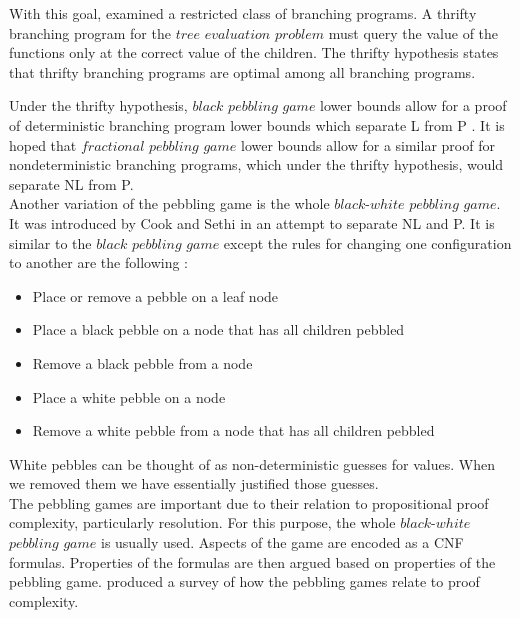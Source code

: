 \documentclass[12pt]{article}
\begin{document}
With this goal, \cite{c:pebjournal} examined a restricted class of branching programs. A thrifty branching program for the $tree$ $evaluation$ $problem$ must query the value of the functions only at the correct value of the children. The thrifty hypothesis states that thrifty branching programs are optimal among all branching programs.

Under the thrifty hypothesis, $black$ $pebbling$ $game$ lower bounds allow for a proof of deterministic branching program lower bounds which separate L from P \cite{c:pebjournal}. It is hoped that $fractional $ $pebbling$ $game$ lower bounds allow for a similar proof for nondeterministic branching programs, which under the thrifty hypothesis, would separate NL from P.\\


Another variation of the pebbling game is the whole $black$-$white$ $pebbling$ $game$. It was introduced by Cook and Sethi \cite{cs:pfromnl} in an attempt to separate  NL and P. It is similar to the $black$ $pebbling$ $game$ except the rules for changing one configuration to another are the following :

\begin{itemize}

\item
Place or remove a pebble on a leaf node

\item
Place a black pebble on a node that has all children pebbled

\item
Remove a black pebble from a node

\item
Place a white pebble on a node

\item
Remove a white pebble from a node that has all children pebbled

\end{itemize}

White pebbles can be thought of as non-deterministic guesses for values. When we removed them we have essentially justified those guesses.\\

The pebbling games are important due to their relation to propositional proof complexity, particularly resolution. For this purpose, the whole $black$-$white$ $pebbling$ $game$ is usually used. Aspects of the game are encoded as a CNF formulas. Properties of the formulas are then argued based on properties of the pebbling game. \cite{nord:survey2} produced a survey of how the pebbling games relate to proof complexity.
\end{document}
